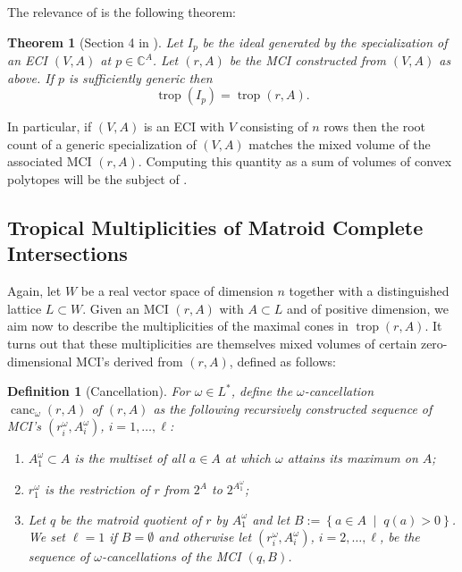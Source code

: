 \documentclass[a4paper]{article}
\newtheorem{definition}{Definition}
\newtheorem{theorem}{Theorem}
\theoremstyle{remark}
\newcommand{\setdes}[2]{\left\{#1\;\middle|\;#2\right\}}
\def\CC{\mathbb{C}}
\DeclareMathOperator{\trop}{trop}
\DeclareMathOperator{\canc}{canc}
\begin{document}
The relevance of  is the following theorem:
\begin{theorem}[Section 4 in \cite{esterovEngineeredCompleteIntersections2024}]
  \label{thm:tropvps}
  Let $I_p$ be the ideal generated by the specialization of an ECI
  $(V,A)$ at $p\in \CC^A$. Let $(r,A)$ be the MCI constructed from
  $(V,A)$ as above. If $p$ is sufficiently generic then
  \[\trop(I_p) = \trop(r,A).\]
\end{theorem}

In particular, if $(V,A)$ is an ECI with $V$ consisting of $n$ rows
then the root count of a generic specialization of $(V,A)$ matches the
mixed volume of the associated MCI $(r,A)$. Computing this quantity as
a sum of volumes of convex polytopes will be the subject of
.

\subsection{Tropical Multiplicities of Matroid Complete Intersections}
\label{sec:weights}

Again, let $W$ be a real vector space of dimension $n$ together with a
distinguished lattice $L\subset W$. Given an MCI $(r,A)$ with
$A\subset L$ and of positive dimension, we aim now to describe the
multiplicities of the maximal cones in $\trop(r,A)$. It turns out that
these multiplicities are themselves mixed volumes of certain
zero-dimensional MCI's derived from $(r,A)$, defined as follows:

\begin{definition}[Cancellation]
  \label{def:canc}
  For $\omega\in L^{*}$, define the {\em $\omega$-cancellation}
  $\canc_{\omega}(r,A)$ of $(r,A)$ as the following recursively constructed
  sequence of MCI's $(r^{\omega}_i,A_i^{\omega})$, $i = 1,\dots,\ell$:
  \begin{enumerate}
  \item $A^{\omega}_1\subset A$ is the multiset of all $a\in A$ at which
    $\omega$ attains its maximum on $A$;
  \item $r^{\omega}_1$ is the restriction of $r$ from $2^A$ to $2^{A^{\omega}_1}$;
  \item Let $q$ be the matroid quotient of $r$ by $A_1^{\omega}$ and let
    $B:=\setdes{a\in A}{q(a)> 0}$.  We set $\ell = 1$ if
    $B= \emptyset$ and otherwise let $(r^{\omega}_i,A_i^{\omega})$,
    $i = 2,\dots,\ell$, be the sequence of $\omega$-cancellations of the MCI
    $(q,B)$.
  \end{enumerate}
\end{definition}
\end{document}
